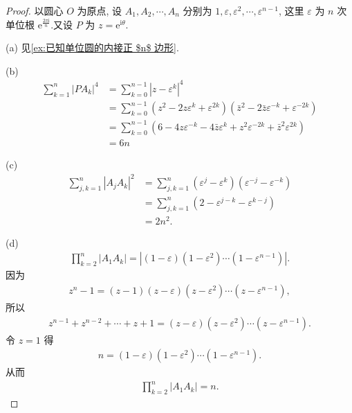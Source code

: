 \begin{proof}
	以圆心 $O$ 为原点, 设 $A_1, A_2, \cdots, A_n$ 分别为 $1, \varepsilon, \varepsilon^2, \cdots, \varepsilon^{n-1}$, 这里 $\varepsilon$ 为 $n$ 次单位根 $\mathrm{e}^{\frac{2 \pi \mathrm{i}}{n}}$.又设 $P$ 为 $z = \mathrm{e}^{\mathrm{i} \theta}$.

	(a) 见\autoref{ex:已知单位圆的内接正 $n$ 边形}.
	
	(b)
	\begin{align*}
		\sum_{k=1}^n\left|P A_k\right|^4 & =\sum_{k=0}^{n-1}\left|z-\varepsilon^k\right|^4                                                                                           \\
		                                 & =\sum_{k=0}^{n-1}\left(z^2-2 z \varepsilon^k+\varepsilon^{2 k}\right)\left(\bar{z}^2-2 \bar{z} \varepsilon^{-k}+\varepsilon^{-2 k}\right) \\
		                                 & =\sum_{k=0}^{n-1}\left(6-4 z \varepsilon^{-k}-4 \bar{z} \varepsilon^k+z^2 \varepsilon^{-2 k}+\bar{z}^2 \varepsilon^{2 k}\right)           \\
		                                 & =6 n
	\end{align*}

	(c)
	\begin{align*}
		\sum_{j, k=1}^n\left|A_j A_k\right|^2 & =\sum_{j, k=1}^n\left(\varepsilon^j-\varepsilon^k\right)\left(\varepsilon^{-j}-\varepsilon^{-k}\right) \\
		                                      & =\sum_{j, k=1}^n\left(2-\varepsilon^{j-k}-\varepsilon^{k-j}\right)                                     \\
		                                      & =2 n^2 .
	\end{align*}

	(d)
	\begin{align*}
		\prod_{k=2}^n\left|A_1 A_k\right|=\left|(1-\varepsilon)\left(1-\varepsilon^2\right) \cdots\left(1-\varepsilon^{n-1}\right)\right|.
	\end{align*}
	因为
	\begin{align}\label{eq:z^n-1}
		z^n-1=(z-1)(z-\varepsilon)\left(z-\varepsilon^2\right) \cdots\left(z-\varepsilon^{n-1}\right),
	\end{align}
	所以
	\begin{align}
		z^{n-1}+z^{n-2}+\cdots+z+1=(z-\varepsilon)\left(z-\varepsilon^2\right) \cdots\left(z-\varepsilon^{n-1}\right).
	\end{align}
	令 $z=1$ 得
	\begin{align*}
		n=(1-\varepsilon)\left(1-\varepsilon^2\right) \cdots\left(1-\varepsilon^{n-1}\right).
	\end{align*}
	从而
	\begin{align*}
		\prod_{k=2}^n\left|A_1 A_k\right|=n.
	\end{align*}


\end{proof}
